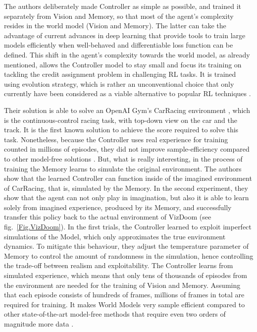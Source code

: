 The authors deliberately made Controller as simple as possible, and trained it separately from Vision and Memory, so that most of the agent's complexity resides in the world model (Vision and Memory). The latter can take the advantage of current advances in deep learning that provide tools to train large models efficiently when well-behaved and differentiable loss function can be defined.
This shift in the agent's complexity towards the world model, as already mentioned, allows the Controller model to stay small and focus its training on tackling the credit assignment problem in challenging RL tasks. It is trained using evolution strategy, which is rather an unconventional choice that only currently have been considered as a viable alternative to popular RL techniques \cite{Algo.ESRL}.

Their solution is able to solve an OpenAI Gym's CarRacing environment \cite{Code.OpenAIGym}, which is the continuous-control racing task, with top-down view on the car and the track. It is the first known solution to achieve the score required to solve this task. Nonetheless, because the Controller uses real experience for training counted in millions of episodes, they did not improve sample-efficiency compared to other model-free solutions \cite{Algo.CarRacingA3C}. But, what is really interesting, in the process of training the Memory learns to simulate the original environment. The authors show that the learned Controller can function inside of the imagined environment of CarRacing, that is, simulated by the Memory.
In the second experiment, they show that the agent can not only play in imagination, but also it is able to learn solely from imagined experience, produced by its Memory, and successfully transfer this policy back to the actual environment of VizDoom (see fig.~\ref{Fig.VizDoom}). In the first trials, the Controller learned to exploit imperfect simulations of the Model, which only approximates the true environment dynamics. To mitigate this behaviour, they adjust the temperature parameter  \cite{Algo.Sketch-RNN} of Memory to control the amount of randomness in the simulation, hence controlling the trade-off between realism and exploitability.
The Controller learns from simulated experience, which means that only tens of thousands of episodes from the environment are needed for the training of Vision and Memory. Assuming that each episode consists of hundreds of frames, millions of frames in total are required for training. It makes World Models very sample efficient compared to other state-of-the-art model-free methods that require even two orders of magnitude more data \cite{Algo.A3C}.

